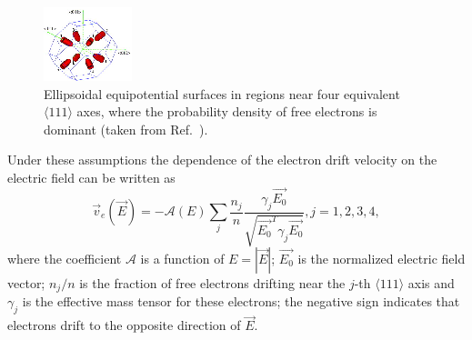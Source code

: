 \documentclass[epj,referee]{svjour}
\begin{document}
\begin{figure}[htpb]
\centering
\includegraphics[width=0.6\linewidth]{valleys}   
\caption{Ellipsoidal equipotential surfaces in regions near four
equivalent $\langle 111 \rangle$ axes, where the probability density
of free electrons is dominant (taken from Ref.~\cite{bart}).}
\label{f:valley} 
\end{figure} 

Under these assumptions the dependence of the electron drift velocity
on the electric field can be written as
\begin{equation} 
\label{e:ed} 
\vec{v}_{e}(\vec{E}) = - \mathcal{A}(E) \sum_{j} \frac{n_{j}}{n} 
\frac{\gamma_{j}\vec{E_{0}}}
{\sqrt{\vec{E_{0}}^{T}\gamma_{j}\vec{E_{0}}}}, 
j=1,2,3,4,
\end{equation} 
where the coefficient $\mathcal{A}$ is a function of $E = |\vec{E}|$;
$\vec{E_{0}}$ is the normalized electric field vector; $n_{j}/n$ is
the fraction of free electrons drifting near the $j$-th $\langle 111
\rangle$ axis and $\gamma_{j}$ is the effective mass tensor for these
electrons; the negative sign indicates that electrons drift to the
opposite direction of $\vec{E}$.
\end{document}
